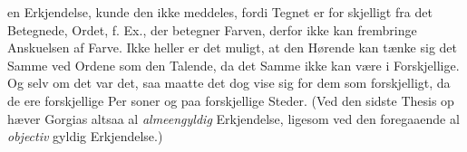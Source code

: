 \documentclass[12pt,a4paper]{book}
\newcommand{\gk}[1]{\textit{#1}}
\begin{document}
%
%
%
%
%
en Erkjendelse, kunde den ikke meddeles, fordi Tegnet er for\-%
skjelligt fra det Betegnede, Ordet, f. Ex., der betegner Farven,
derfor ikke kan frembringe Anskuelsen af Farve. Ikke heller
er det muligt, at den Hørende kan tænke sig det Samme ved
Ordene som den Talende, da det Samme ikke kan være i
Forskjellige. Og selv om det var det, saa maatte det dog
vise sig for dem som forskjelligt, da de ere forskjellige Per\-%
soner og paa forskjellige Steder. (Ved den sidste Thesis op\-%
hæver Gorgias altsaa al \emph{almeengyldig} Erkjendelse, ligesom
ved den foregaaende al \emph{objectiv} gyldig Erkjendelse.)
\end{document}
